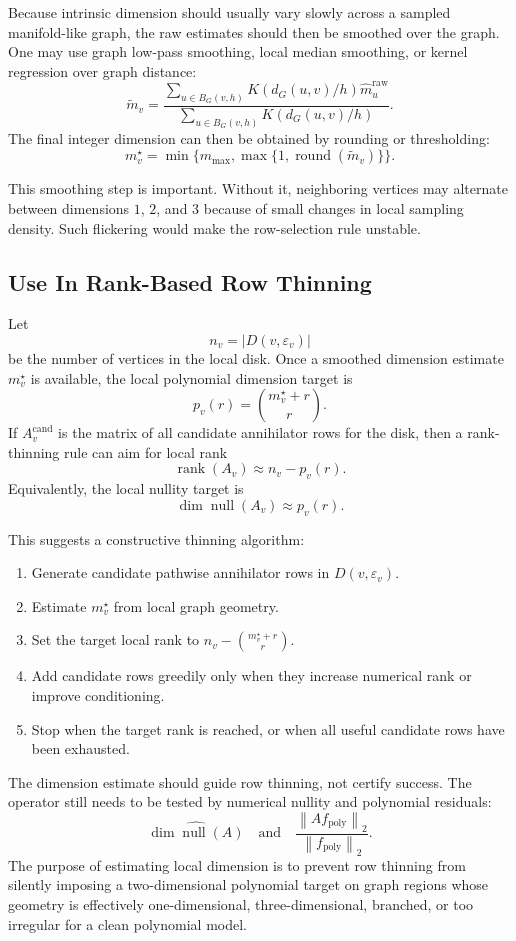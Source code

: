 \documentclass[11pt]{article}
\newcommand{\norm}[1]{\left\lVert #1 \right\rVert}
\newcommand{\rank}{\operatorname{rank}}
\newcommand{\nullsp}{\operatorname{null}}
\newcommand{\eps}{\varepsilon}
\begin{document}
Because intrinsic dimension should usually vary slowly across a sampled
manifold-like graph, the raw estimates should then be smoothed over the graph.
One may use graph low-pass smoothing, local median smoothing, or kernel
regression over graph distance:
\[
  \widetilde m_v
  =
  \frac{
    \sum_{u\in B_G(v,h)}
    K\!\left(d_G(u,v)/h\right)
    \widehat m_u^{\mathrm{raw}}
  }{
    \sum_{u\in B_G(v,h)}
    K\!\left(d_G(u,v)/h\right)
  }.
\]
The final integer dimension can then be obtained by rounding or thresholding:
\[
  m_v^\star
  =
  \min\{m_{\max},\max\{1,\operatorname{round}(\widetilde m_v)\}\}.
\]

This smoothing step is important.  Without it, neighboring vertices may
alternate between dimensions \(1\), \(2\), and \(3\) because of small changes
in local sampling density.  Such flickering would make the row-selection rule
unstable.

\subsection{Use In Rank-Based Row Thinning}

Let
\[
  n_v=|D(v,\eps_v)|
\]
be the number of vertices in the local disk.  Once a smoothed dimension
estimate \(m_v^\star\) is available, the local polynomial dimension target is
\[
  p_v(r)
  =
  \binom{m_v^\star+r}{r}.
\]
If \(A_v^{\mathrm{cand}}\) is the matrix of all candidate annihilator rows for
the disk, then a rank-thinning rule can aim for local rank
\[
  \rank(A_v)
  \approx
  n_v-p_v(r).
\]
Equivalently, the local nullity target is
\[
  \dim\nullsp(A_v)
  \approx
  p_v(r).
\]

This suggests a constructive thinning algorithm:
\begin{enumerate}
  \item Generate candidate pathwise annihilator rows in \(D(v,\eps_v)\).
  \item Estimate \(m_v^\star\) from local graph geometry.
  \item Set the target local rank to \(n_v-\binom{m_v^\star+r}{r}\).
  \item Add candidate rows greedily only when they increase numerical rank or
        improve conditioning.
  \item Stop when the target rank is reached, or when all useful candidate
        rows have been exhausted.
\end{enumerate}

The dimension estimate should guide row thinning, not certify success.  The
operator still needs to be tested by numerical nullity and polynomial residuals:
\[
  \widehat{\dim\nullsp(A)}
  \quad\text{and}\quad
  \frac{\norm{A f_{\mathrm{poly}}}_2}{\norm{f_{\mathrm{poly}}}_2}.
\]
The purpose of estimating local dimension is to prevent row thinning from
silently imposing a two-dimensional polynomial target on graph regions whose
geometry is effectively one-dimensional, three-dimensional, branched, or too
irregular for a clean polynomial model.
\end{document}
